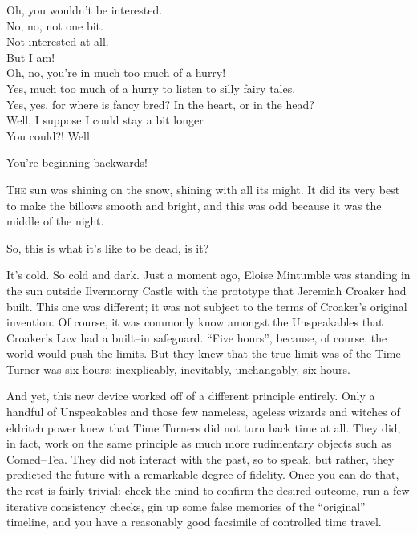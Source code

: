 {Oh, you wouldn’t be interested.\\
No, no, not one bit.\\
Not interested at all.\\
But I am!\\
Oh, no, you’re in much too much of a hurry!\\
Yes, much too much of a hurry to listen to silly fairy tales.\\
Yes, yes, for where is fancy bred? In the heart, or in the head?\\
Well, I suppose I could stay a bit longer{\el}\\
You could?! Well{\el}

}%
{You’re beginning backwards!} %


\simpleline
{}
\lettrine{T}{he} sun was shining on the snow, shining with all its might. It did its very best to make the billows smooth and bright, and this was odd because it was the middle of the night.

So, this is what it’s like to be dead, is it?

It’s cold. So cold and dark. Just a moment ago, Eloise Mintumble was standing in the sun outside Ilvermorny Castle with the prototype that Jeremiah Croaker had built. This one was different; it was not subject to the terms of Croaker’s original invention. Of course, it was commonly know amongst the Unspeakables that Croaker’s Law had a built\mbox{--}in safeguard. “Five hours”, because, of course, the world would push the limits. But they knew that the true limit was of the Time\mbox{--}Turner was six hours: inexplicably, inevitably, unchangably, six hours.

And yet, this new device worked off of a different principle entirely. Only a handful of Unspeakables and those few nameless, ageless wizards and witches of eldritch power knew that Time Turners did not turn back time at all. They did, in fact, work on the same principle as much more rudimentary objects such as Comed\mbox{--}Tea. They did not interact with the past, so to speak, but rather, they predicted the future with a remarkable degree of fidelity. Once you can do that, the rest is fairly trivial: check the mind to confirm the desired outcome, run a few iterative consistency checks, gin up some false memories of the “original” timeline, and you have a reasonably good facsimile of controlled time travel.

